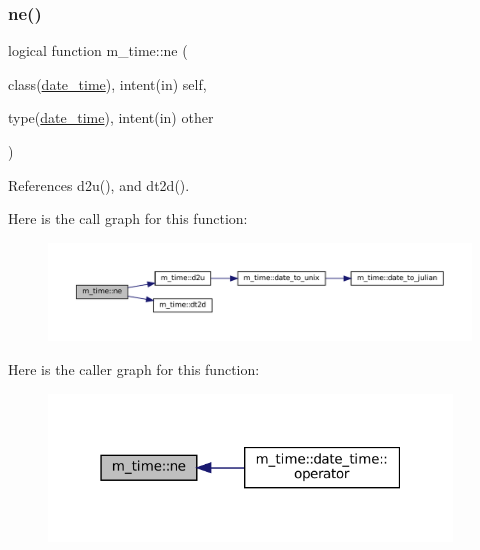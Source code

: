 \subsubsection{\texorpdfstring{ne()}{ne()}}
{\footnotesize\ttfamily logical function m\+\_\+time\+::ne (\begin{DoxyParamCaption}\item[{class(\mbox{\hyperlink{structm__time_1_1date__time}{date\+\_\+time}}), intent(in)}]{self,  }\item[{type(\mbox{\hyperlink{structm__time_1_1date__time}{date\+\_\+time}}), intent(in)}]{other }\end{DoxyParamCaption})\hspace{0.3cm}{\ttfamily [private]}}



References d2u(), and dt2d().

Here is the call graph for this function\+:\nopagebreak
\begin{figure}[H]
\begin{center}
\leavevmode
\includegraphics[width=350pt]{namespacem__time_ac0e0df383f424680ce59f5540e02348b_cgraph}
\end{center}
\end{figure}
Here is the caller graph for this function\+:\nopagebreak
\begin{figure}[H]
\begin{center}
\leavevmode
\includegraphics[width=304pt]{namespacem__time_ac0e0df383f424680ce59f5540e02348b_icgraph}
\end{center}
\end{figure}
\mbox{\label{namespacem__time_a6b5e87be0e510ff268c1ecfbf67a3bdb}} 

